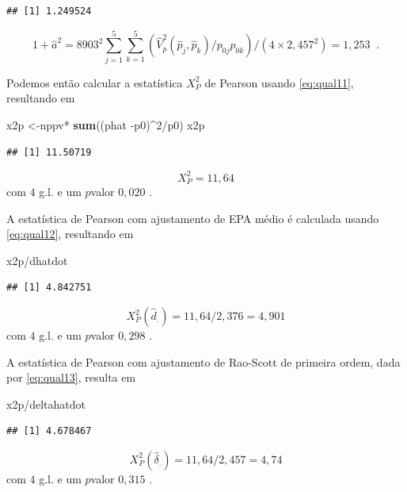 \documentclass[]{book}
\newenvironment{Shaded}{\begin{snugshade}}{\end{snugshade}}
\newcommand{\KeywordTok}[1]{\textcolor[rgb]{0.13,0.29,0.53}{\textbf{{#1}}}}
\newcommand{\DecValTok}[1]{\textcolor[rgb]{0.00,0.00,0.81}{{#1}}}
\newcommand{\StringTok}[1]{\textcolor[rgb]{0.31,0.60,0.02}{{#1}}}
\newcommand{\NormalTok}[1]{{#1}}
\numberwithin{example}{chapter}
\numberwithin{remark}{chapter}
\numberwithin{definition}{chapter}
\begin{document}
\begin{verbatim}
## [1] 1.249524
\end{verbatim}

\[
1+\hat{a}^{2}=8903^{2}\sum\limits_{j=1}^{5}\sum\limits_{k=1}^{5}\left( \hat{V}_{p}^{2}\left( \hat{p}_{j},\hat{p}_{k}\right) /p_{0j}p_{0k}\right) /\left(
4\times 2,457^{2}\right) =1,253\;\;. 
\]

Podemos então calcular a estatística \(X_{P}^{2}\) de Pearson usando
\eqref{eq:qual11}, resultando em

\begin{Shaded}
\begin{Highlighting}[]
\NormalTok{x2p <-nppv*}\StringTok{ }\KeywordTok{sum}\NormalTok{((phat -p0)^}\DecValTok{2}\NormalTok{/p0)}
\NormalTok{x2p}
\end{Highlighting}
\end{Shaded}

\begin{verbatim}
## [1] 11.50719
\end{verbatim}

\[
X_{P}^{2}=11,64 
\] com \(4\) g.l. e um \(p\)valor \(0,020\) .

A estatística de Pearson com ajustamento de EPA médio é calculada usando
\eqref{eq:qual12}, resultando em

\begin{Shaded}
\begin{Highlighting}[]
\NormalTok{x2p/dhatdot}
\end{Highlighting}
\end{Shaded}

\begin{verbatim}
## [1] 4.842751
\end{verbatim}

\[
X_{P}^{2}\left( \hat{d}_{.}\right) =11,64/2,376=4,901 
\] com \(4\) g.l. e um \(p\)valor \(0,298\) .

A estatística de Pearson com ajustamento de Rao-Scott de primeira ordem,
dada por \eqref{eq:qual13}, resulta em

\begin{Shaded}
\begin{Highlighting}[]
\NormalTok{x2p/deltahatdot }
\end{Highlighting}
\end{Shaded}

\begin{verbatim}
## [1] 4.678467
\end{verbatim}

\[
X_{P}^{2}\left( \hat{\delta}_{.}\right) =11,64/2,457=4,74 
\] com \(4\) g.l. e um \(p\)valor \(0,315\) .
\end{document}

